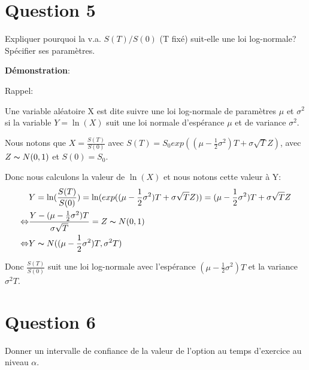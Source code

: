 \documentclass[a4paper,10pt]{report}
\begin{document}
\section{Question 5}
\par \noindent Expliquer pourquoi la v.a. $S(T)/S(0)$ (T fixé) suit-elle une loi log-normale? Spécifier ses paramètres.

\noindent \textbf{Démonstration}:
\par \noindent Rappel:
\par \noindent Une variable aléatoire X est dite suivre une loi log-normale de paramètres $\mu$ et $\sigma^{2}$ si la variable $Y = \ln(X)$ suit une loi normale d'espérance $\mu$ et de variance $\sigma^{2}$.
\par \noindent Nous notons que $X = \frac{S(T)}{S(0)}$ avec $S(T) = S_{0} exp((\mu - \frac{1}{2} \sigma^{2})T + \sigma \sqrt{T} Z)$, avec $Z \thicksim N(0,1)$ et $S(0) = S_{0}$.
\par \noindent Donc nous calculons la valeur de $\ln(X)$ et nous notons cette valeur à Y:
\begin{align*}
	&Y = \ln(\frac{S(T)}{S(0)}) = \ln(exp((\mu - \frac{1}{2} \sigma^{2})T + \sigma \sqrt{T} Z)) = (\mu - \frac{1}{2} \sigma^{2})T + \sigma \sqrt{T} Z \\
	\Leftrightarrow &\frac{Y - (\mu - \frac{1}{2} \sigma^{2})T}{\sigma \sqrt{T}} = Z \thicksim N(0,1) \\
	\Leftrightarrow & Y \thicksim N((\mu - \frac{1}{2} \sigma^{2})T, \sigma^{2} T)
\end{align*}
\par \noindent Donc $\frac{S(T)}{S(0)}$ suit une loi log-normale avec l'espérance $(\mu - \frac{1}{2} \sigma^{2})T$ et la variance $\sigma^{2} T$.

\section{Question 6}
\par \noindent Donner un intervalle de confiance de la valeur de l'option au temps d'exercice au niveau $\alpha$.
\end{document}
